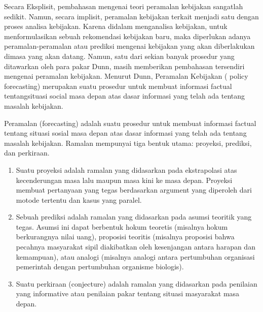 \par Secara Eksplisit, pembahasan mengenai teori peramalan kebijakan sangatlah sedikit. Namun, secara implisit, peramalan kebijakan terkait menjadi satu dengan proses analisa kebijakan. Karena didalam menganalisa kebijakan, untuk menformulasikan sebuah rekomendasi kebijakan baru, maka diperlukan adanya peramalan-peramalan atau prediksi mengenai kebijakan yang akan diberlakukan dimasa yang akan datang. Namun, satu dari sekian banyak prosedur yang ditawarkan oleh para pakar Dunn, masih memberikan pembahasan tersendiri mengenai peramalan kebijakan. Menurut Dunn, Peramalan Kebijakan ( policy forecasting) merupakan suatu prosedur untuk membuat informasi factual tentangsituasi social masa depan atas dasar informasi yang telah ada tentang masalah kebijakan.\\

\par Peramalan (forecasting) adalah suatu prosedur untuk membuat informasi factual tentang situasi sosial masa depan atas dasar informasi yang telah ada tentang masalah kebijakan. Ramalan mempunyai tiga bentuk utama: proyeksi, prediksi, dan perkiraan. 
\begin{enumerate}
\item Suatu proyeksi adalah ramalan yang didasarkan pada ekstrapolasi atas kecenderungan masa lalu maupun masa kini ke masa depan. Proyeksi membuat pertanyaan yang tegas berdasarkan argument yang diperoleh dari motode tertentu dan kasus yang paralel.
\item Sebuah prediksi adalah ramalan yang didasarkan pada asumsi teoritik yang tegas. Asumsi ini dapat berbentuk hokum teoretis (misalnya hokum berkurangnya nilai uang), proposisi teoritis (misalnya proposisi bahwa pecahnya masyarakat sipil diakibatkan oleh kesenjangan antara harapan dan kemampuan), atau analogi (misalnya analogi antara pertumbuhan organisasi pemerintah dengan pertumbuhan organisme biologis).
\item Suatu perkiraan (conjecture) adalah ramalan yang didasarkan pada penilaian yang informative atau penilaian pakar tentang situasi masyarakat masa depan.\\
\end{enumerate}

